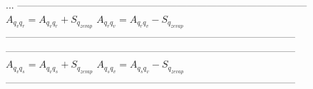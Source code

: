 \documentclass[
a4paper,     %
12pt,        %
article,
onecolumn,   %
openany,     %
]{memoir}
\begin{document}
%
\begin{algorithm}[H]
\begin{algorithmic}
\vspace{.2cm}
\State ...
\vspace{.2cm}
\Indent
\vspace{-.2cm}
\State ---------------------------------------------------------------------------------------
\vspace{-.2cm}
\State $A_{q_v q_r} = A_{q_v q_r} + S_{q_{zevap}}$
\State $A_{q_r q_v} = A_{q_r q_v} - S_{q_{zevap}}$
\vspace{-.2cm}
\State ---------------------------------------------------------------------------------------
\vspace{.4cm}
\EndIndent
{}
\Indent
\vspace{-.2cm}
\State ---------------------------------------------------------------------------------------
\vspace{-.2cm}
\State $A_{q_v q_s} = A_{q_v q_s} + S_{q_{zevap}}$
\State $A_{q_s q_v} = A_{q_s q_v} - S_{q_{zevap}}$
\vspace{-.2cm}
\State ---------------------------------------------------------------------------------------
\vspace{.4cm}
\EndIndent
\end{algorithmic}
\end{algorithm}
%




\newpage
\end{document}
